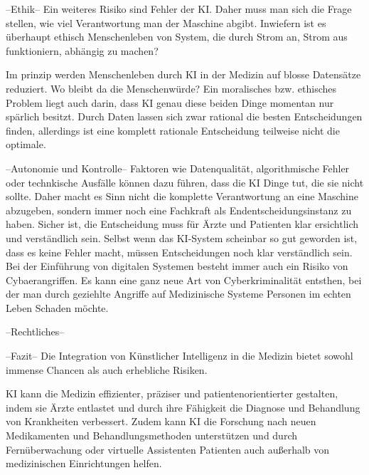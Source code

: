 \vspace{2em}
--Ethik--
Ein weiteres Risiko sind Fehler der KI. Daher muss man sich die Frage stellen, wie viel Verantwortung man der Maschine abgibt.
Inwiefern ist es überhaupt ethisch Menschenleben von System, die durch Strom an, Strom aus funktioniern, abhängig zu machen?

Im prinzip werden Menschenleben durch KI in der Medizin auf blosse Datensätze reduziert. Wo bleibt da die Menschenwürde?
Ein moralisches bzw. ethisches Problem liegt auch darin, dass KI genau diese beiden Dinge momentan nur spärlich besitzt. 
Durch Daten lassen sich zwar rational  die besten Entscheidungen finden, allerdings ist eine komplett rationale Entscheidung teilweise nicht die optimale.

\vspace{2em}
--Autonomie und Kontrolle--
Faktoren wie Datenqualität, algorithmische Fehler oder technkische Ausfälle können dazu führen, dass die KI Dinge tut, die sie nicht sollte. 
Daher macht es Sinn nicht die komplette Verantwortung an eine Maschine abzugeben, sondern immer noch eine Fachkraft als Endentscheidungsinstanz zu haben.
Sicher ist, die Entscheidung muss für Ärzte und Patienten klar ersichtlich und verständlich sein. Selbst wenn das KI-System scheinbar so gut geworden ist, dass es keine Fehler macht, 
müssen Entscheidungen noch klar verständlich sein. Bei der Einführung von digitalen Systemen besteht immer auch ein  Risiko von Cybaerangriffen.
Es kann eine ganz neue Art von Cyberkriminalität entsthen, bei der man durch geziehlte Angriffe auf Medizinische Systeme Personen im echten Leben Schaden möchte.

\vspace{2em}
--Rechtliches--




\vspace{2em}
--Fazit--
Die Integration von Künstlicher Intelligenz in die Medizin bietet sowohl immense Chancen als auch erhebliche Risiken. 

KI kann die Medizin effizienter, präziser und patientenorientierter gestalten, indem sie Ärzte entlastet und durch ihre Fähigkeit die Diagnose und Behandlung von Krankheiten verbessert. 
Zudem kann KI die Forschung nach neuen Medikamenten und Behandlungsmethoden unterstützen und durch Fernüberwachung oder virtuelle Assistenten Patienten auch außerhalb von medizinischen Einrichtungen helfen.

